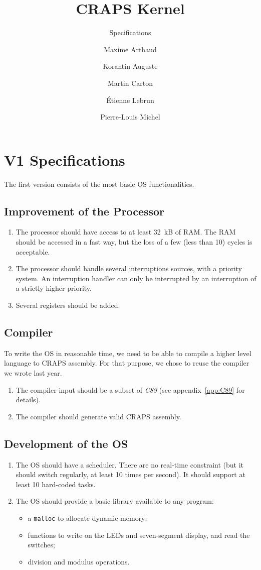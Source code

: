 \documentclass{article}
\title{CRAPS Kernel}
\subtitle{Specifications}
\author{
       Maxime Arthaud
  \and Korantin Auguste
  \and Martin Carton
  \and Étienne Lebrun
  \and Pierre-Louis Michel
}
\begin{document}
  
  \newpage
    \section{V1 Specifications}
      The first version consists of the most basic OS functionalities.

      \subsection{Improvement of the Processor}
        \begin{enumerate}
          \item The processor should have access to at least \SI{32}{kB} of RAM.
            The RAM should be accessed in a fast way, but the loss of a few
            (less than 10) cycles is acceptable.
          \item The processor should handle several interruptions sources, with
            a priority system. An interruption handler can only be interrupted
            by an interruption of a strictly higher priority.
          \item Several registers should be added.
        \end{enumerate}

      \subsection{Compiler}
        To write the OS in reasonable time, we need to be able to compile a
        higher level language to CRAPS assembly. For that purpose, we chose to
        reuse the compiler we wrote last year.
        \begin{enumerate}
          \item The compiler input should be a subset of \textit{C89} (see
            appendix~\ref{app:C89} for details).
          \item The compiler should generate valid CRAPS assembly.
        \end{enumerate}

      \subsection{Development of the OS}
        \begin{enumerate}
          \item The OS should have a scheduler. There are no real-time
          constraint (but it should switch regularly, at least 10 times per
          second). It should support at least 10 hard-coded tasks.
          \item The OS should provide a basic library available to any program:
            \begin{itemize}
              \item a \verb+malloc+ to allocate dynamic memory;
              \item functions to write on the LEDs and seven-segment display,
                and read the switches;
              \item division and modulus operations.
             \end{itemize}
        \end{enumerate}
\end{document}

